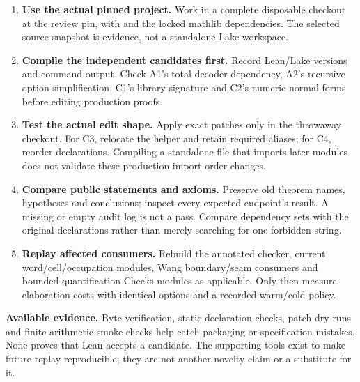 \begin{enumerate}
\item \textbf{Use the actual pinned project.} Work in a complete disposable
checkout at the review pin, with
 and the locked mathlib dependencies. The
selected source snapshot is evidence, not a standalone Lake workspace.
\item \textbf{Compile the independent candidates first.} Record Lean/Lake
versions and command output. Check A1's total-decoder dependency, A2's
recursive option simplification, C1's library signature and C2's numeric
normal forms before editing production proofs.
\item \textbf{Test the actual edit shape.} Apply exact patches only in the
throwaway checkout. For C3, relocate the helper and retain required aliases;
for C4, reorder declarations. Compiling a standalone file that imports later
modules does not validate these production import-order changes.
\item \textbf{Compare public statements and axioms.} Preserve old theorem
names, hypotheses and conclusions; inspect every expected endpoint's
 result. A missing or empty audit log is not a pass.
Compare dependency sets with the original declarations rather than merely
searching for one forbidden string.
\item \textbf{Replay affected consumers.} Rebuild the annotated checker,
current word/cell/occupation modules, Wang boundary/seam consumers and
bounded-quantification Checks modules as applicable. Only then measure
elaboration costs with identical options and a recorded warm/cold policy.
\end{enumerate}

\textbf{Available evidence.} Byte verification, static declaration checks,
patch dry runs and finite arithmetic smoke checks help catch packaging or
specification mistakes. None proves that Lean accepts a candidate. The
supporting  tools exist to make future replay
reproducible; they are not another novelty claim or a substitute for it.
